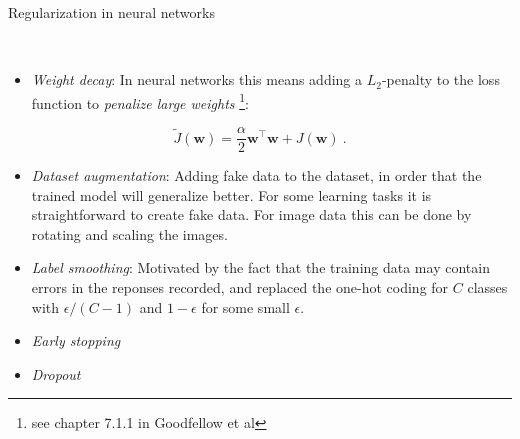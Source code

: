 \documentclass[10pt,ignorenonframetext,]{beamer}
\providecommand{\tightlist}{%
  \setlength{\itemsep}{0pt}\setlength{\parskip}{0pt}}
\begin{document}
\begin{frame}

\begin{block}{Regularization in neural networks}

\(~\)

\begin{itemize}
\tightlist
\item
  \emph{Weight decay}: In neural networks this means adding a
  \(L_2\)-penalty to the loss function to \emph{penalize large weights}
  \footnote{see chapter 7.1.1 in Goodfellow et al}:
\end{itemize}

\[ \tilde{J}({\boldsymbol w})= \frac{\alpha}{2}{{\boldsymbol w}^\top{\boldsymbol w}} + J({\boldsymbol w}) \ .\]

\vspace{2mm}

\begin{itemize}
\tightlist
\item
  \emph{Dataset augmentation}: Adding fake data to the dataset, in order
  that the trained model will generalize better. For some learning tasks
  it is straightforward to create fake data. For image data this can be
  done by rotating and scaling the images.
\end{itemize}

\vspace{2mm}

\begin{itemize}
\tightlist
\item
  \emph{Label smoothing}: Motivated by the fact that the training data
  may contain errors in the reponses recorded, and replaced the one-hot
  coding for \(C\) classes with \(\epsilon/(C-1)\) and \(1-\epsilon\)
  for some small \(\epsilon\).
\end{itemize}

\vspace{2mm}

\begin{itemize}
\tightlist
\item
  \emph{Early stopping}
\end{itemize}

\vspace{2mm}

\begin{itemize}
\tightlist
\item
  \emph{Dropout}
\end{itemize}

\end{block}

\end{frame}
\end{document}
